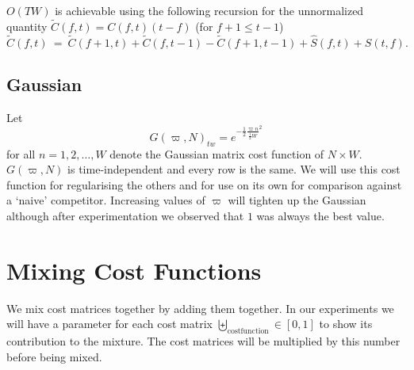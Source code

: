 \documentclass[twocolumn]{article}
\begin{document}
	$O(TW)$ is achievable using the following recursion for the unnormalized quantity $\tilde
	C(f,t) = C(f,t)(t-f)$ (for $f+1 \le t-1$)
	\begin{dmath*}
		\tilde C(f,t) ~=~ \tilde C(f+1,t) + \tilde C(f,t-1) - \tilde C(f+1,t-1) + \hat S(f,t) + \hat S(t,f).
	\end{dmath*}
	
	\begin{center}
	\end{center}
	
	\subsection{Gaussian}
	Let \[
	G( \varpi, N )_{tw} = e^{ - \frac{1}{2} \frac{\varpi n}{ \frac{1}{2} W}^2  }
	\] for all $n=1,2,\ldots,W$ denote the Gaussian matrix cost function of $N\times W$. $G( \varpi, N )$ is time-independent and every row is the same. We will use this cost function for regularising the others and for use on its own for comparison against a `naive' competitor. Increasing values of $\varpi$ will tighten up the Gaussian although after experimentation we observed that $1$ was always the best value.
	
	\section{Mixing Cost Functions}
	
	We mix cost matrices together by adding them together. In our experiments we will have a parameter for each cost matrix $\biguplus_{\mathrm{costfunction}} \in [0,1]$ to show its contribution to the mixture. The cost matrices will be multiplied by this number before being mixed. 
	
\end{document}
